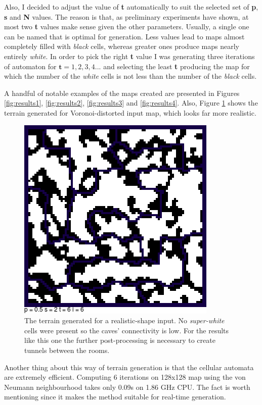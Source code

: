 \documentclass[a4paper, 11pt]{article} %
\begin{document}
Also, I decided to adjust the value of \textbf{t} automatically to suit the selected set of \textbf{p}, \textbf{s} and \textbf{N} values. The reason is that, as preliminary experiments have shown, at most two \textbf{t} values make sense given the other parameters. Usually, a single one can be named that is optimal for generation. Less values lead to maps almost completely filled with \emph{black} cells, whereas greater ones produce maps nearly entirely \emph{white}. In order to pick the right \textbf{t} value I was generating three iterations of automaton for $\textbf{t} = 1,2,3,4...$ and selecting the least \textbf{t} producing the map for which the number of the \emph{white} cells is not less than the number of the \emph{black} cells.

A handful of notable examples of the maps created are presented in Figures \ref{fig:results1}, \ref{fig:results2}, \ref{fig:results3} and \ref{fig:results4}. Also, Figure \ref{fig:voronoi} shows the terrain generated for Voronoi-distorted input map, which looks far more realistic.

\begin{figure}
	\centering
	\includegraphics[scale=0.5]{voronoi}
	\caption{The terrain generated for a realistic-shape input. No \emph{super-white} cells were present so the caves' connectivity is low. For the results like this one the further post-processing is necessary to create tunnels between the rooms.}
	\label{fig:voronoi}
\end{figure}

Another thing about this way of terrain generation is that the cellular automata are extremely efficient. Computing 6 iterations on 128x128 map using the von Neumann neighbourhood takes only 0.09s on 1.86 GHz CPU. The fact is worth mentioning since it makes the method suitable for real-time generation. 
\end{document}
